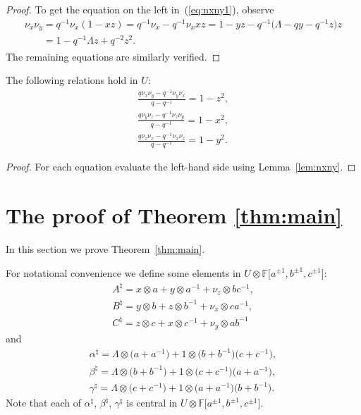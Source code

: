\begin{proof}
To get the equation on the left in~(\ref{eq:nxny1}), observe
\begin{gather*}
\nu_x \nu_y  =  q^{-1}\nu_x (1-xz) =q^{-1}\nu_x -q^{-1} \nu_x x z
= 1-yz -q^{-1}\big(\Lambda - qy-q^{-1}z\big)z
\\
\phantom{\nu_x \nu_y}{}  =  1-q^{-1}\Lambda z + q^{-2}z^2.
\end{gather*}
The remaining equations are similarly verif\/ied.
\end{proof}


\begin{Lemma}
\label{lem:comnxny}
The following relations hold in
$U$:
\begin{gather}
\frac{q\nu_x\nu_y - q^{-1} \nu_y \nu_x}{q-q^{-1}}  =  1-z^2,
\label{eq:c1}
\\
\frac{q\nu_y\nu_z - q^{-1} \nu_z \nu_y}{q-q^{-1}}  =  1-x^2,
\label{eq:c2}
\\
\frac{q\nu_z\nu_x - q^{-1} \nu_x \nu_z}{q-q^{-1}}  =  1-y^2.
\label{eq:c3}
\end{gather}
\end{Lemma}

\begin{proof}
 For each equation evaluate the left-hand side using
Lemma~\ref{lem:nxny}.
\end{proof}

\section{The proof of Theorem  \ref{thm:main}}\label{section4}


In this section we prove Theorem~\ref{thm:main}.

For notational convenience we def\/ine some elements in
$U \otimes
\mathbb F \lbrack a^{\pm 1}, b^{\pm 1}, c^{\pm 1}\rbrack$:
\begin{gather}
A^\natural  =  x \otimes a + y \otimes a^{-1} + \nu_z \otimes bc^{-1},
\label{eq:aform}
\\
B^\natural  =  y \otimes b + z \otimes b^{-1} + \nu_x \otimes ca^{-1},
\label{eq:bform}
\\
C^\natural  =  z \otimes c + x \otimes c^{-1} + \nu_y \otimes ab^{-1}
\label{eq:cform}
\end{gather}
and
\begin{gather}
\alpha^\natural
 =
\Lambda \otimes \big(a+a^{-1}\big) + 1 \otimes \big(b+b^{-1}\big)\big(c+c^{-1}\big),
\label{eq:amaincom1}
\\
\beta^\natural  =
\Lambda \otimes \big(b+b^{-1}\big) + 1 \otimes \big(c+c^{-1}\big)(a+a^{-1}\big),
\label{eq:bmaincom2}
\\
\gamma^\natural
 =
\Lambda \otimes \big(c+c^{-1}\big) + 1 \otimes \big(a+a^{-1}\big)\big(b+b^{-1}\big).
\label{eq:cmaincom3}
\end{gather}
Note that each of $\alpha^\natural$, $\beta^\natural$, $\gamma^\natural$ is
central in
$U \otimes
\mathbb F \lbrack a^{\pm 1}, b^{\pm 1}, c^{\pm 1}\rbrack$.

